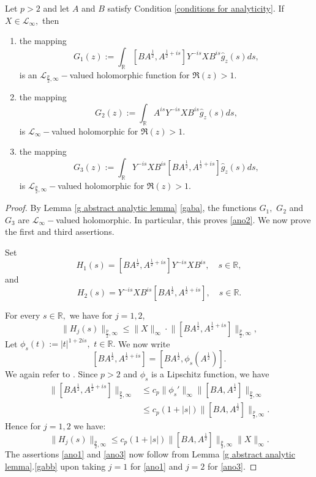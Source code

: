     \begin{lem}\label{another analytic lemma} 
        Let $p>2$ and let $A$ and $B$ satisfy Condition \ref{conditions for analyticity}. If $X\in\mathcal{L}_{\infty},$ then
        \begin{enumerate}[{\rm (i)}]
            \item\label{ano1} the mapping
                $$G_1(z) := \int_{\mathbb{R}}[BA^{\frac12},A^{\frac12+is}]Y^{-is}XB^{is}\hat{g}_z(s)ds,$$
                is an $\mathcal{L}_{\frac{p}{2},\infty}-$valued holomorphic function for $\Re(z)>1.$
            \item\label{ano2} the mapping
                $$G_2(z) := \int_{\mathbb{R}}A^{is}Y^{-is}XB^{is}\hat{g}_z(s)ds,$$
                is $\mathcal{L}_{\infty}-$valued holomorphic for $\Re(z)>1.$
            \item\label{ano3} the mapping
                $$G_3(z) := \int_{\mathbb{R}}Y^{-is}XB^{is}[BA^{\frac12},A^{\frac12+is}]\hat{g}_z(s)ds,$$
                is $\mathcal{L}_{\frac{p}{2},\infty}-$valued holomorphic for $\Re(z)>1.$
        \end{enumerate}
    \end{lem}
    \begin{proof} 
        By Lemma \ref{g abstract analytic lemma} \eqref{gaba}, the functions $G_1,$ $G_2$ and $G_3$ are $\mathcal{L}_{\infty}-$valued holomorphic. 
        In particular, this proves \eqref{ano2}. We now prove the first and third assertions.

        Set
        $$H_1(s)=[BA^{\frac12},A^{\frac12+is}]Y^{-is}XB^{is},\quad s\in\mathbb{R},$$
        and
        $$H_2(s)=Y^{-is}XB^{is}[BA^{\frac12},A^{\frac12+is}],\quad s\in\mathbb{R}.$$

        For every $s\in\mathbb{R},$ we have for $j = 1,2$,
        $$\Big\|H_j(s)\Big\|_{\frac{p}{2},\infty}\leq\|X\|_{\infty}\cdot\Big\|[BA^{\frac12},A^{\frac12+is}]\Big\|_{\frac{p}{2},\infty},$$
        Let $\phi_s(t) := |t|^{1+2is},$ $t\in\mathbb{R}.$ We now write
        $$[BA^{\frac12},A^{\frac12+is}]=[BA^{\frac12},\phi_s(A^{\frac12})].$$
        We again refer to \cite{PS-acta}. Since $p > 2$ and $\phi_s$ is a Lipschitz function, we have
        \begin{align*}
            \|[BA^{\frac12},A^{\frac12+is}]\|_{\frac{p}{2},\infty} &\leq c_p\|\phi_s'\|_{\infty}\|[BA,A^{\frac12}]\|_{\frac{p}{2},\infty}\\
                                                                   &\leq c_p(1+|s|)\|[BA,A^{\frac12}]\|_{\frac{p}{2},\infty}.
        \end{align*}
        Hence for $j = 1,2$ we have:
        $$\|H_j(s)\|_{\frac{p}{2},\infty}\leq c_p(1+|s|)\|[BA,A^{\frac12}]\|_{\frac{p}{2},\infty}\|X\|_{\infty}.$$
        The assertions \eqref{ano1} and \eqref{ano3} now follow from Lemma \ref{g abstract analytic lemma}.\eqref{gabb}
        upon taking $j=1$ for \eqref{ano1} and $j=2$ for \eqref{ano3}.
    \end{proof}

